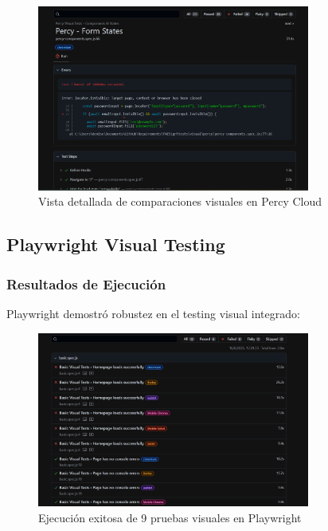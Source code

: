 \documentclass{article}
\begin{document}
\begin{figure}[H]
\centering
\includegraphics[width=0.8\textwidth]{percy/details.png}
\caption{Vista detallada de comparaciones visuales en Percy Cloud}
\label{fig:percy-details}
\end{figure}

\subsection{Playwright Visual Testing}

\subsubsection{Resultados de Ejecución}
Playwright demostró robustez en el testing visual integrado:

\begin{figure}[H]
\centering
\includegraphics[width=0.8\textwidth]{playwright/1pruebas.png}
\caption{Ejecución exitosa de 9 pruebas visuales en Playwright}
\label{fig:playwright-success}
\end{figure}
\end{document}

